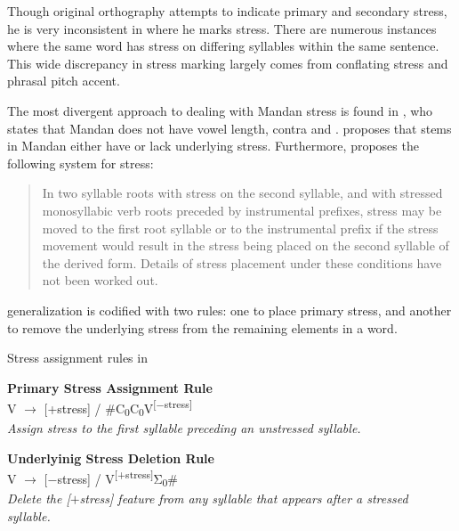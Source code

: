 Though  original orthography attempts to indicate primary and secondary stress, he is very inconsistent in where he marks stress. There are numerous instances where the same word has stress on differing syllables within the same sentence. This wide discrepancy in stress marking largely comes from \citeauthor{kennard1936} conflating stress and phrasal pitch accent.

The most divergent approach to dealing with Mandan stress is found in \citet{hollow1970}, who states that Mandan does not have vowel length, contra \citet{kennard1936} and \citet{maximilian1839}. \citeauthor{hollow1970} proposes that stems in Mandan either have or lack underlying stress. Furthermore, \citet[50]{hollow1970} proposes the following system for stress:

\begin{quote}
In two syllable roots with stress on the second syllable, and with stressed monosyllabic verb roots preceded by instrumental prefixes, stress may be moved to the first root syllable or to the instrumental prefix if the stress movement would result in the stress being placed on the second syllable of the derived form. Details of stress placement under these conditions have not been worked out.
\end{quote}

\noindent {} generalization is codified with two rules: one to place primary stress, and another to remove the underlying stress from the remaining elements in a word.

\begin{exe}
\item\label{hollowstressrules} Stress assignment rules in \citet{hollow1970}

\begin{xlist}
\item\label{hollowstressrules1} \textbf{Primary Stress Assignment Rule}\\
V $\to$ [+stress] / \#C\textsubscript{0}{\longrule}C\textsubscript{0}V\textsuperscript{[$-$stress]}\\
	\textit{Assign stress to the first syllable preceding an unstressed syllable.}

\item\label{hollowstressrules2} \textbf{Underlyinig Stress Deletion Rule}\\
V $\to$ [$-$stress] / V\textsuperscript{[+stress]}Σ\textsubscript{0}{\longrule}\#\\
	\textit{Delete the [$+$stress] feature from any syllable that appears after a stressed syllable.}

\end{xlist}

\end{exe}

